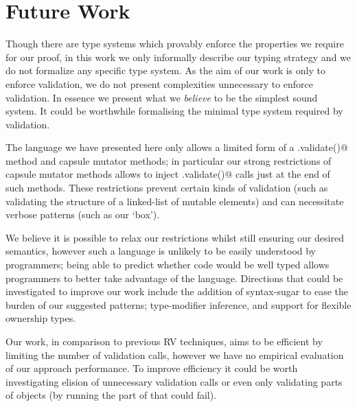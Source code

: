\section{Future Work}
Though there are type systems which provably enforce the properties we require for our proof,
in this work we only informally describe our typing strategy and we
do not formalize any specific type system.
As the aim of our work is only to enforce validation, we do not present complexities unnecessary to enforce validation. 
In essence we present what we \emph{believe} to be the simplest sound system.
It could be worthwhile formalising the minimal type system required by validation.






The language we have presented here only allows a limited form of a \Q@.validate()@ method
and capsule mutator methods; in particular
our strong restrictions of capsule mutator methods
allows to inject \Q@.validate()@ calls just at the end of such methods.
These restrictions prevent certain kinds of validation (such as validating the structure of a linked-list of mutable elements) and can necessitate verbose patterns (such as our `box').

We believe it is possible to relax our restrictions whilst
still ensuring our desired semantics, however such a language is unlikely to be easily understood by programmers;
being able to predict whether code would be well typed allows programmers
to better take advantage of the language.
Directions that could be investigated to improve our work include the addition of syntax-sugar to ease the burden of our suggested patterns; type-modifier inference, and support for flexible ownership types.

Our work, in comparison to previous RV techniques, aims to be efficient by limiting the number of validation calls, however we have no empirical evaluation of our approach performance.
To improve efficiency it could be worth investigating elision of unnecessary validation calls
or even only validating parts of objects (by running the part of \Q@validate@ that could fail).